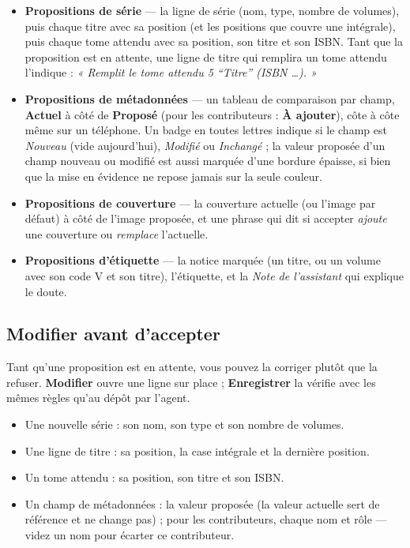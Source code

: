 \begin{itemize}
  \item \textbf{Propositions de série} --- la ligne de série (nom,
        type, nombre de volumes), puis chaque titre avec sa position
        (et les positions que couvre une intégrale), puis chaque tome
        attendu avec sa position, son titre et son ISBN. Tant que la
        proposition est en attente, une ligne de titre qui remplira un
        tome attendu l'indique : \emph{« Remplit le tome attendu 5
        “Titre” (ISBN \dots). »}
  \item \textbf{Propositions de métadonnées} --- un tableau de
        comparaison par champ, \textbf{Actuel} à côté de
        \textbf{Proposé} (pour les contributeurs : \textbf{À
        ajouter}), côte à côte même sur un téléphone. Un badge en
        toutes lettres indique si le champ est \emph{Nouveau} (vide
        aujourd'hui), \emph{Modifié} ou \emph{Inchangé} ; la valeur
        proposée d'un champ nouveau ou modifié est aussi marquée d'une
        bordure épaisse, si bien que la mise en évidence ne repose
        jamais sur la seule couleur.
  \item \textbf{Propositions de couverture} --- la couverture actuelle
        (ou l'image par défaut) à côté de l'image proposée, et une
        phrase qui dit si accepter \emph{ajoute} une couverture ou
        \emph{remplace} l'actuelle.
  \item \textbf{Propositions d'étiquette} --- la notice marquée (un
        titre, ou un volume avec son code V et son titre), l'étiquette,
        et la \emph{Note de l'assistant} qui explique le doute.
\end{itemize}

\subsection{Modifier avant d'accepter}

Tant qu'une proposition est en attente, vous pouvez la corriger
plutôt que la refuser. \textbf{Modifier} ouvre une ligne sur place ;
\textbf{Enregistrer} la vérifie avec les mêmes règles qu'au dépôt
par l'agent.

\begin{itemize}
  \item Une nouvelle série : son nom, son type et son nombre de
        volumes.
  \item Une ligne de titre : sa position, la case intégrale et la
        dernière position.
  \item Un tome attendu : sa position, son titre et son ISBN.
  \item Un champ de métadonnées : la valeur proposée (la valeur
        actuelle sert de référence et ne change pas) ; pour les
        contributeurs, chaque nom et rôle --- videz un nom pour
        écarter ce contributeur.
\end{itemize}

